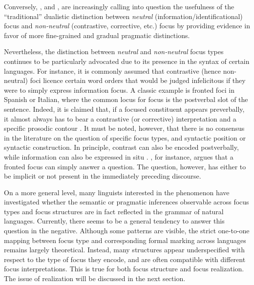 Conversely, \textcite{torregrossa2012towards}, \textcite{cruschina2012discourse} and \textcite{cruschina2021,cruschina_mayol_2024_syntax_mapping, cruschina_mayol_2025_gradience_optionality}, are increasingly calling into question the usefulness of the ``traditional” dualistic distinction between \textit{neutral} (information{\slash}identificational) focus and \textit{non-neutral} (contrastive, corrective, etc.) focus by providing evidence in favor of more fine-grained and gradual pragmatic distinctions.

Nevertheless, the distinction between \textit{neutral} and \textit{non-neutral} focus types continues to be particularly advocated due to its presence in the syntax of certain languages. For instance, it is commonly assumed that contrastive (hence non-neutral) foci licence certain word orders that would be judged infelicitous if they were to simply express information focus. A classic example is fronted foci in Spanish or Italian, where the common locus for focus is the postverbal slot of the sentence. Indeed, it is claimed that, if a focused constituent appears preverbally, it almost always has to bear a contrastive (or corrective) interpretation and a specific prosodic contour \parencite{beninca1988ordine, bianchi2013focus, zubizarreta1999word}. It must be noted, however, that there is no consensus in the literature on the question of specific focus types, and syntactic position or syntactic construction. In principle, contrast can also be encoded postverbally, while information can also be expressed in situ \parencite{cruschina2021, cruschina_mayol_2025_gradience_optionality}. \textcite{brunetti2004}, for instance, argues that a fronted focus can simply answer a question. The question, however, has either to be implicit or not present in the immediately preceding discourse.

On a more general level, many linguists interested in the phenomenon  have investigated whether the semantic or pragmatic inferences observable across focus types and focus structures are in fact reflected in the grammar of natural languages.
Currently, there seems to be a general tendency to answer this question in the negative. Although some patterns are visible, the strict one-to-one mapping between focus type and corresponding formal marking across languages remains largely theoretical. Instead, many structures appear underspecified with respect to the type of focus they encode, and are often compatible with different focus interpretations. This is  true for both focus structure and focus realization. The issue of realization will be discussed in the next section.

